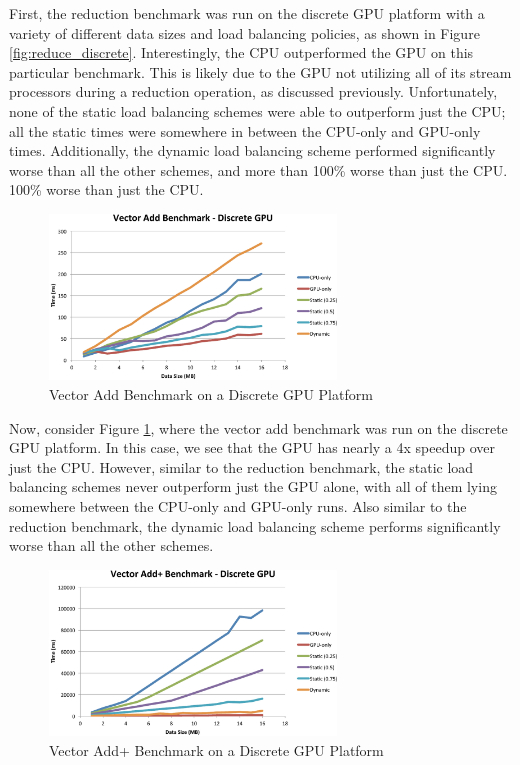\documentclass[journal]{IEEEtran}
\begin{document}
First, the reduction benchmark was run on the discrete GPU platform with a variety of
different data sizes and load balancing policies, as shown in Figure \ref{fig:reduce_discrete}.
Interestingly, the CPU outperformed the GPU on this particular benchmark.  This is likely
due to the GPU not utilizing all of its stream processors during a reduction operation, as
discussed previously.  Unfortunately, none of the static load balancing schemes were able
to outperform just the CPU; all the static times were somewhere in between the CPU-only and
GPU-only times.  Additionally, the dynamic load balancing scheme performed significantly
worse than all the other schemes, and more than 100\% worse than just the CPU.
100\% worse than just the CPU.

\begin{figure}[t]
\centering
\includegraphics[width=3.0in]{vector_discrete}
\caption{Vector Add Benchmark on a Discrete GPU Platform}
\label{fig:vector_discrete}
\end{figure}

Now, consider Figure \ref{fig:vector_discrete}, where the vector add benchmark was run on
the discrete GPU platform.  In this case, we see that the GPU has nearly a 4x speedup over
just the CPU.  However, similar to the reduction benchmark, the static load balancing schemes
never outperform just the GPU alone, with all of them lying somewhere between the CPU-only
and GPU-only runs.  Also similar to the reduction benchmark, the dynamic load balancing scheme
performs significantly worse than all the other schemes.

\begin{figure}[t]
\centering
\includegraphics[width=3.0in]{vector_plus_discrete}
\caption{Vector Add+ Benchmark on a Discrete GPU Platform}
\label{fig:vector_plus_discrete}
\end{figure}
\end{document}
